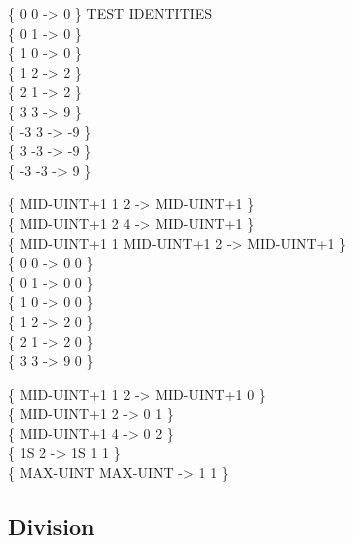 \begin{tt}
\{  0  0 \word{*} ->  0 \} \tab[4]  TEST IDENTITIES \\
\{  0  1 \word{*} ->  0 \} \\
\{  1  0 \word{*} ->  0 \} \\
\{  1  2 \word{*} ->  2 \} \\
\{  2  1 \word{*} ->  2 \} \\
\{  3  3 \word{*} ->  9 \} \\
\{ -3  3 \word{*} -> -9 \} \\
\{  3 -3 \word{*} -> -9 \} \\
\{ -3 -3 \word{*} ->  9 \}

\{ MID-UINT+1 1  2 \word{*} -> MID-UINT+1 \} \\
\{ MID-UINT+1 2  4 \word{*} -> MID-UINT+1 \} \\
\{ MID-UINT+1 1  MID-UINT+1  2 \word{*} -> MID-UINT+1 \} \\

\{ 0 0  -> 0 0 \} \\
\{ 0 1  -> 0 0 \} \\
\{ 1 0  -> 0 0 \} \\
\{ 1 2  -> 2 0 \} \\
\{ 2 1  -> 2 0 \} \\
\{ 3 3  -> 9 0 \}

\{ MID-UINT+1 1  2  -> MID-UINT+1 0 \} \\
\{ MID-UINT+1 2                  -> 0 1 \} \\
\{ MID-UINT+1 4                  -> 0 2 \} \\
\{ 1S 2                          -> 1S 1  1 \} \\
\{ MAX-UINT MAX-UINT             -> 1 1  \}
\end{tt}

\subsection{Division}

